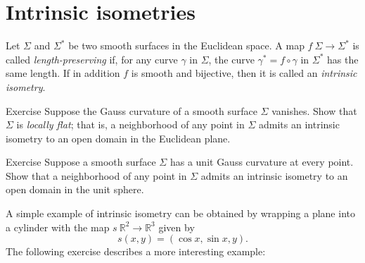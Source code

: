 \section{Intrinsic isometries}

Let $\Sigma$ and $\Sigma^{*}$ be two smooth surfaces in the Euclidean space.
A map $f\:\Sigma\to \Sigma^{*}$ is called \emph{length-preserving} if, for any curve $\gamma$ in $\Sigma$, the curve $\gamma^{*}=f\circ\gamma$ in $\Sigma^{*}$ has the same length. 
If in addition $f$ is smooth and bijective, then it is called an  \emph{intrinsic isometry}. 

\begin{thm}{Exercise}\label{ex:K=0}
Suppose the Gauss curvature of a smooth surface $\Sigma$ vanishes.
Show that $\Sigma$ is \emph{locally flat};
that is, a neighborhood of any point in $\Sigma$ admits an intrinsic isometry to an open domain in the Euclidean plane.  
\end{thm}

\begin{thm}{Exercise}\label{ex:K=1}
Suppose a smooth surface $\Sigma$ has a unit Gauss curvature at every point.
Show that a neighborhood of any point in $\Sigma$ admits an intrinsic isometry to an open domain in the unit sphere.
\end{thm}

A simple example of intrinsic isometry can be obtained by wrapping a plane into a cylinder with the map $s\:\mathbb{R}^2 \to \mathbb{R}^3$ given by 
\[s(x,y) = (\cos x ,\sin x, y).\]
The following exercise describes a more interesting example:

